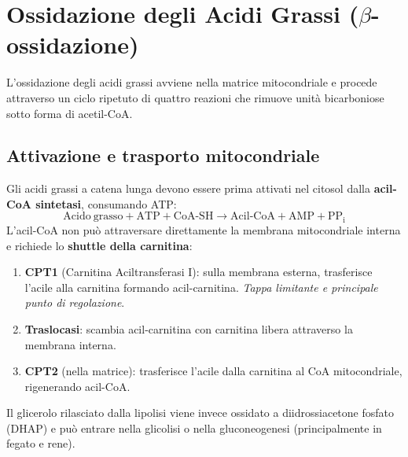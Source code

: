 \documentclass[12pt,a4paper]{report}
\begin{document}
\section{Ossidazione degli Acidi Grassi (\(\beta\)-ossidazione)}
L'ossidazione degli acidi grassi avviene nella matrice mitocondriale e procede attraverso un ciclo ripetuto di quattro reazioni che rimuove unità bicarboniose sotto forma di acetil-CoA.
\subsection{Attivazione e trasporto mitocondriale}
Gli acidi grassi a catena lunga devono essere prima attivati nel citosol dalla \textbf{acil-CoA sintetasi}, consumando ATP:
\[
\mathrm{Acido\ grasso + ATP + CoA\text{-}SH \rightarrow Acil\text{-}CoA + AMP + PP_i}
\]
L'acil-CoA non può attraversare direttamente la membrana mitocondriale interna e richiede lo \textbf{shuttle della carnitina}:
\begin{enumerate}
\item \textbf{CPT1} (Carnitina Aciltransferasi I): sulla membrana esterna, trasferisce l'acile alla carnitina formando acil-carnitina. \textit{Tappa limitante e principale punto di regolazione}.
\item \textbf{Traslocasi}: scambia acil-carnitina con carnitina libera attraverso la membrana interna.
\item \textbf{CPT2} (nella matrice): trasferisce l'acile dalla carnitina al CoA mitocondriale, rigenerando acil-CoA.
\end{enumerate}
Il glicerolo rilasciato dalla lipolisi viene invece ossidato a diidrossiacetone fosfato (DHAP) e può entrare nella glicolisi o nella gluconeogenesi (principalmente in fegato e rene).
\end{document}
